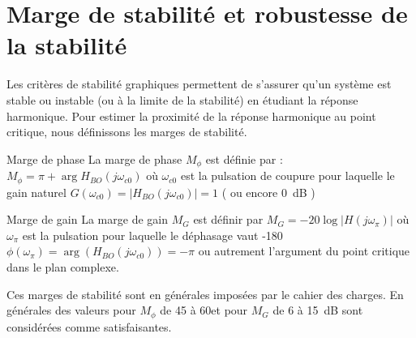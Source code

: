 \section{Marge de stabilité et robustesse de la stabilité}
Les critères de stabilité graphiques permettent de s'assurer qu'un système 
est stable ou instable (ou à la limite de la stabilité) en étudiant la réponse
harmonique. Pour estimer la proximité de la réponse harmonique au point 
critique, nous définissons les marges de stabilité. 
\begin{bdefinition}{Marge de phase}
La marge de phase $M_{\phi}$ est définie par :
$M_\phi=\pi+\arg{H_{BO}(j\omega_{c0})}$ où $\omega_{c0}$ est la pulsation de 
coupure pour laquelle le gain naturel $G(\omega_{c0})=|H_{BO}(j\omega_{c0})|=1$
( ou encore 0~\si{\dB} ) 
\end{bdefinition}
\begin{bdefinition}{Marge de gain}
La marge de gain $M_G$ est définir par $M_G=-20\log{|H(j\omega_\pi)|}$ où 
$\omega_{\pi}$ est la pulsation pour laquelle le déphasage vaut 
-180\degreeSI $\phi(\omega_\pi)=\arg{(H_{BO}(j\omega_{c0}))}=-\pi$
ou autrement l'argument du point critique dans le plan complexe.
\end{bdefinition}
Ces marges de stabilité sont en générales imposées par le cahier des charges.
En générales des valeurs pour $M_{\phi}$ de 45 à 60\degreeSI et
pour $M_G$ de 6 à 15~\si{\dB} sont considérées comme satisfaisantes.

